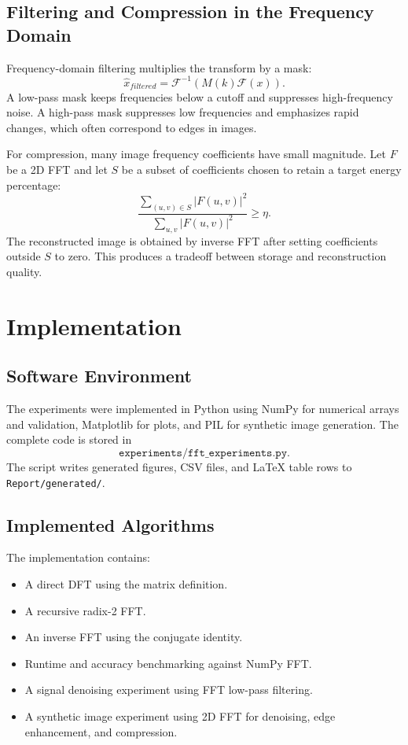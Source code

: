 \documentclass{zc-ust-hw}
\begin{document}
\subsection{Filtering and Compression in the Frequency Domain}
Frequency-domain filtering multiplies the transform by a mask:
\begin{equation}
\widehat{x}_{filtered}=\mathcal{F}^{-1}\left(M(k)\mathcal{F}(x)\right).
\end{equation}
A low-pass mask keeps frequencies below a cutoff and suppresses high-frequency noise. A high-pass mask suppresses low frequencies and emphasizes rapid changes, which often correspond to edges in images.

For compression, many image frequency coefficients have small magnitude. Let \(F\) be a 2D FFT and let \(S\) be a subset of coefficients chosen to retain a target energy percentage:
\begin{equation}
\frac{\sum_{(u,v)\in S}|F(u,v)|^2}{\sum_{u,v}|F(u,v)|^2}\geq \eta.
\end{equation}
The reconstructed image is obtained by inverse FFT after setting coefficients outside \(S\) to zero. This produces a tradeoff between storage and reconstruction quality.

\section{Implementation}
\subsection{Software Environment}
The experiments were implemented in Python using NumPy for numerical arrays and validation, Matplotlib for plots, and PIL for synthetic image generation. The complete code is stored in
\[
\texttt{experiments/fft\_experiments.py}.
\]
The script writes generated figures, CSV files, and LaTeX table rows to \texttt{Report/generated/}.

\subsection{Implemented Algorithms}
The implementation contains:
\begin{itemize}
    \item A direct DFT using the matrix definition.
    \item A recursive radix-2 FFT.
    \item An inverse FFT using the conjugate identity.
    \item Runtime and accuracy benchmarking against NumPy FFT.
    \item A signal denoising experiment using FFT low-pass filtering.
    \item A synthetic image experiment using 2D FFT for denoising, edge enhancement, and compression.
\end{itemize}
\end{document}
